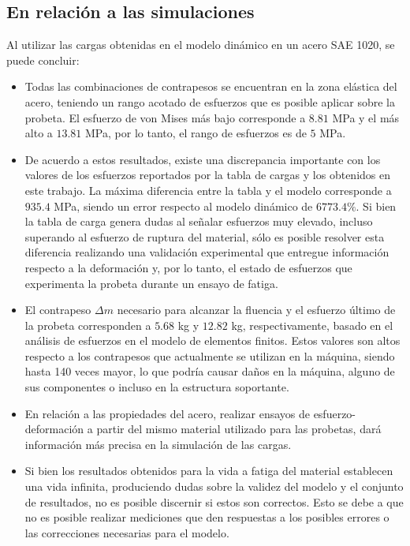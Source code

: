 \subsection{En relación a las simulaciones}
Al utilizar las cargas obtenidas en el modelo dinámico en un acero SAE 1020, se puede concluir:
\begin{itemize}
	\item Todas las combinaciones de contrapesos se encuentran en la zona elástica del acero, teniendo un rango acotado de esfuerzos que es posible aplicar sobre la probeta. El esfuerzo de von Mises más bajo corresponde a $8.81$ MPa y el más alto a $13.81$ MPa, por lo tanto, el rango de esfuerzos es de $5$ MPa. 
	\item De acuerdo a estos resultados, existe una discrepancia importante con los valores de los esfuerzos reportados por la tabla de cargas y los obtenidos en este trabajo. La máxima diferencia entre la tabla y el modelo corresponde a $935.4$ MPa, siendo un error respecto al modelo dinámico de $6773.4 \%$. Si bien la tabla de carga genera dudas al señalar esfuerzos muy elevado, incluso superando al esfuerzo de ruptura del material, sólo es posible resolver esta diferencia realizando una validación experimental que entregue información respecto a la deformación y, por lo tanto, el estado de esfuerzos que experimenta la probeta durante un ensayo de fatiga. 
	\item El contrapeso $\Delta m$ necesario para alcanzar la fluencia y el esfuerzo último de la probeta corresponden a $5.68$ kg y $12.82$ kg, respectivamente, basado en el análisis de esfuerzos en el modelo de elementos finitos. Estos valores son altos respecto a los contrapesos que actualmente se utilizan en la máquina, siendo hasta 140 veces mayor, lo que podría causar daños en la máquina, alguno de sus componentes o incluso en la estructura soportante.
	\item En relación a las propiedades del acero, realizar ensayos de esfuerzo-deformación a partir del mismo material utilizado para las probetas, dará información más precisa en la simulación de las cargas.
	\item Si bien los resultados obtenidos para la vida a fatiga del material establecen una vida infinita, produciendo dudas sobre la validez del modelo y el conjunto de resultados, no es posible discernir si estos son correctos. Esto se debe a que no es posible realizar mediciones que den respuestas a los posibles errores o las correcciones necesarias para el modelo.
\end{itemize}

